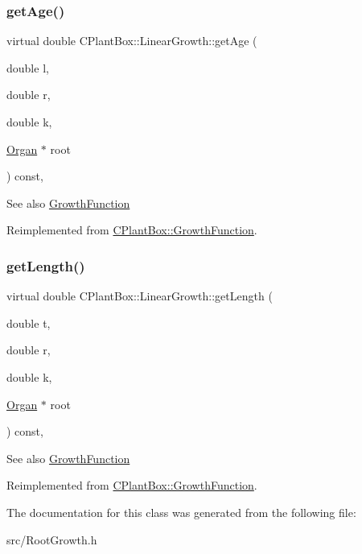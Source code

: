 \subsubsection{\texorpdfstring{get\+Age()}{getAge()}}
{\footnotesize\ttfamily virtual double C\+Plant\+Box\+::\+Linear\+Growth\+::get\+Age (\begin{DoxyParamCaption}\item[{double}]{l,  }\item[{double}]{r,  }\item[{double}]{k,  }\item[{\hyperlink{classCPlantBox_1_1Organ}{Organ} $\ast$}]{root }\end{DoxyParamCaption}) const\hspace{0.3cm}{\ttfamily [inline]}, {\ttfamily [virtual]}}

\begin{DoxySeeAlso}{See also}
\hyperlink{classCPlantBox_1_1GrowthFunction}{Growth\+Function} 
\end{DoxySeeAlso}


Reimplemented from \hyperlink{classCPlantBox_1_1GrowthFunction_a006b428760c410389afa54853fe7cc1f}{C\+Plant\+Box\+::\+Growth\+Function}.

\mbox{\label{classCPlantBox_1_1LinearGrowth_afffda4dacad7cd28f6addb6d3268cf1f}} 
\subsubsection{\texorpdfstring{get\+Length()}{getLength()}}
{\footnotesize\ttfamily virtual double C\+Plant\+Box\+::\+Linear\+Growth\+::get\+Length (\begin{DoxyParamCaption}\item[{double}]{t,  }\item[{double}]{r,  }\item[{double}]{k,  }\item[{\hyperlink{classCPlantBox_1_1Organ}{Organ} $\ast$}]{root }\end{DoxyParamCaption}) const\hspace{0.3cm}{\ttfamily [inline]}, {\ttfamily [virtual]}}

\begin{DoxySeeAlso}{See also}
\hyperlink{classCPlantBox_1_1GrowthFunction}{Growth\+Function} 
\end{DoxySeeAlso}


Reimplemented from \hyperlink{classCPlantBox_1_1GrowthFunction_a41b83da5d75beab49846c5b92a421e43}{C\+Plant\+Box\+::\+Growth\+Function}.



The documentation for this class was generated from the following file\+:\begin{DoxyCompactItemize}
\item 
src/Root\+Growth.\+h\end{DoxyCompactItemize}
